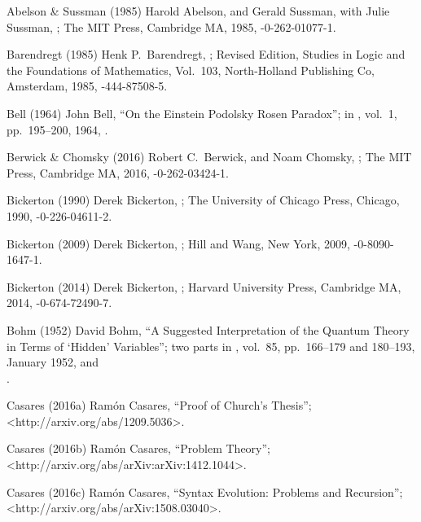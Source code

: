 

 Abelson \& Sussman (1985)
Harold Abelson, and Gerald Sussman, with Julie Sussman,
;
The MIT Press, Cambridge MA, 1985,
-0-262-01077-1.

 Barendregt (1985)
Henk P.\ Barendregt,
;
Revised Edition, Studies in Logic and the Foundations of Mathematics,
Vol.\ 103, North-Holland Publishing Co, Amsterdam, 1985,
-444-87508-5.

 Bell (1964)
John Bell,
``On the Einstein Podolsky Rosen Paradox'';
in ,
vol.\ 1, pp.\ 195--200, 1964,
.

 Berwick \& Chomsky (2016)
Robert C.\ Berwick, and Noam Chomsky,
;
The MIT Press, Cambridge MA, 2016,
-0-262-03424-1.

 Bickerton (1990)
Derek Bickerton,
;
The University of Chicago Press, Chicago, 1990,
-0-226-04611-2.

 Bickerton (2009)
Derek Bickerton,
;
Hill and Wang, New York, 2009,
-0-8090-1647-1.

 Bickerton (2014)
Derek Bickerton,
;
Harvard University Press, Cambridge MA, 2014,
-0-674-72490-7.

 Bohm (1952)
David Bohm,
``A Suggested Interpretation of the Quantum Theory
in Terms of `Hidden' Variables''; two parts
in ,
vol.\ 85, pp.\ 166--179 and 180--193, January 1952,
 and\\
.

 Casares (2016a)
Ram\'on Casares,
``Proof of Church's Thesis'';
<http://arxiv.org/abs/1209.5036>.

 Casares (2016b)
Ram\'on Casares,
``Problem Theory'';
<http://arxiv.org/abs/arXiv:arXiv:1412.1044>.

 Casares (2016c)
Ram\'on Casares,
``Syntax Evolution: Problems and Recursion'';\\
<http://arxiv.org/abs/arXiv:1508.03040>.


